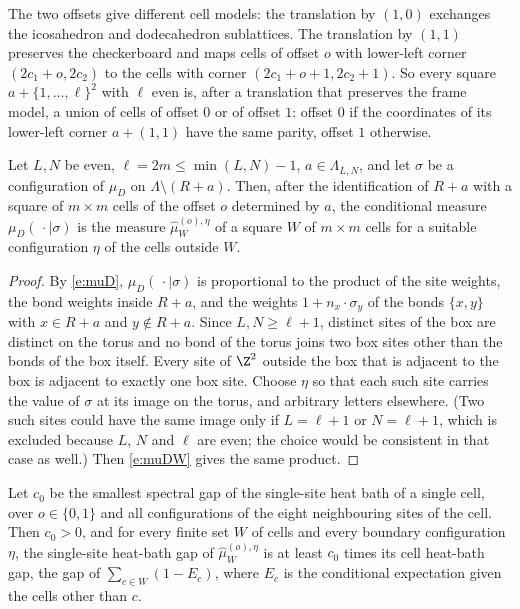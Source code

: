The two offsets give different cell models: the translation by $(1, 0)$ exchanges the icosahedron and dodecahedron sublattices. The translation by $(1, 1)$ preserves the checkerboard and maps cells of offset $o$ with lower-left corner $(2 c_1 + o, 2 c_2)$ to the cells with corner $(2c_1 + o + 1, 2 c_2 + 1)$. So every square $a + \{1, \dots, \ell\}^2$ with $\ell$ even is, after a translation that preserves the frame model, a union of cells of offset $0$ or of offset $1$: offset $0$ if the coordinates of its lower-left corner $a + (1, 1)$ have the same parity, offset $1$ otherwise.

\begin{lemma}\label{l:boxcell}
Let $L, N$ be even, $\ell = 2m \le \min(L, N) - 1$, $a \in \Lambda_{L, N}$, and let $\sigma$ be a configuration of $\mu_D$ on $\Lambda \setminus (R + a)$. Then, after the identification of $R + a$ with a square of $m \times m$ cells of the offset $o$ determined by $a$, the conditional measure $\mu_D(\, \cdot \mid \sigma)$ is the measure $\hat\mu^{(o), \eta}_W$ of a square $W$ of $m \times m$ cells for a suitable configuration $\eta$ of the cells outside $W$.
\end{lemma}

\begin{proof}
By \eqref{e:muD}, $\mu_D(\, \cdot \mid \sigma)$ is proportional to the product of the site weights, the bond weights inside $R + a$, and the weights $1 + n_x \cdot \sigma_y$ of the bonds $\{x, y\}$ with $x \in R + a$ and $y \notin R + a$. Since $L, N \ge \ell + 1$, distinct sites of the box are distinct on the torus and no bond of the torus joins two box sites other than the bonds of the box itself. Every site of $\Z^2$ outside the box that is adjacent to the box is adjacent to exactly one box site. Choose $\eta$ so that each such site carries the value of $\sigma$ at its image on the torus, and arbitrary letters elsewhere. (Two such sites could have the same image only if $L = \ell + 1$ or $N = \ell + 1$, which is excluded because $L$, $N$ and $\ell$ are even; the choice would be consistent in that case as well.) Then \eqref{e:muDW} gives the same product.
\end{proof}

\begin{lemma}\label{l:compare}
Let $c_0$ be the smallest spectral gap of the single-site heat bath of a single cell, over $o \in \{0, 1\}$ and all configurations of the eight neighbouring sites of the cell. Then $c_0 > 0$, and for every finite set $W$ of cells and every boundary configuration $\eta$, the single-site heat-bath gap of $\hat\mu^{(o), \eta}_W$ is at least $c_0$ times its cell heat-bath gap, the gap of $\sum_{c \in W} (1 - E_c)$, where $E_c$ is the conditional expectation given the cells other than $c$.
\end{lemma}

